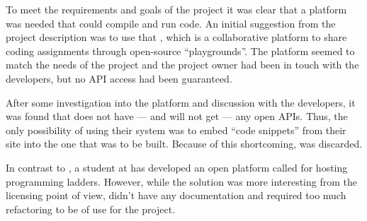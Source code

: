To meet the requirements and goals of the project it was clear that a platform was needed that could compile and run code. An initial suggestion from the project description was to use that \techio{}, which is a collaborative platform to share coding assignments through open-source ``playgrounds''. The platform seemed to match the needs of the project and the project owner had been in touch with the developers, but no API access had been guaranteed.

After some investigation into the platform and discussion with the developers, it was found that \techio{} does not have --- and will not get --- any open APIs. Thus, the only possibility of using their system was to  embed ``code snippets'' from their site into the one that was to be built. Because of this shortcoming, \techio{} was discarded.

In contrast to \techio{}, a student at \LTU{} has developed an open platform called \sockr{} for hosting programming ladders. However, while the solution was more interesting from the licensing point of view, \sockr{} didn't have any documentation and required too much refactoring to be of use for the project.
